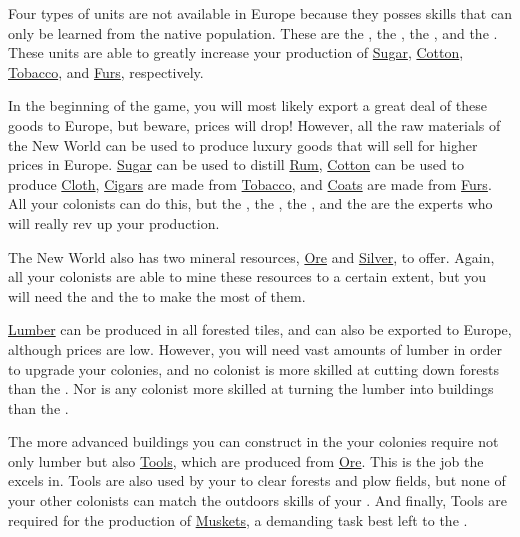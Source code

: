 \documentclass[12pt]{article}
\begin{document}
Four types of units are not available in Europe because they posses
skills that can only be learned from the native population. These are
the , the , the
, and the . These units are able to greatly increase your production of
\hyperlink{Sugar}{Sugar}, \hyperlink{Cotton}{Cotton},
\hyperlink{Tobacco}{Tobacco}, and \hyperlink{Furs}{Furs},
respectively.

In the beginning of the game, you will most likely export a great deal
of these goods to Europe, but beware, prices will drop! However, all
the raw materials of the New World can be used to produce luxury goods
that will sell for higher prices in Europe. \hyperlink{Sugar}{Sugar}
can be used to distill \hyperlink{Rum}{Rum},
\hyperlink{Cotton}{Cotton} can be used to produce
\hyperlink{Cloth}{Cloth}, \hyperlink{Cigars}{Cigars} are made from
\hyperlink{Tobacco}{Tobacco}, and \hyperlink{Coats}{Coats} are made
from \hyperlink{Furs}{Furs}. All your colonists can do this, but the
, the , the , and the  are the experts who
will really rev up your production.

The New World also has two mineral resources, \hyperlink{Ore}{Ore} and
\hyperlink{Silver}{Silver}, to offer. Again, all your colonists are
able to mine these resources to a certain extent, but you will need
the  and the  to make
the most of them.

\hyperlink{Lumber}{Lumber} can be produced in all forested tiles, and
can also be exported to Europe, although prices are low. However, you
will need vast amounts of lumber in order to upgrade your colonies,
and no colonist is more skilled at cutting down forests than the
. Nor is any colonist more skilled at turning
the lumber into buildings than the .

The more advanced buildings you can construct in the your colonies
require not only lumber but also \hyperlink{Tools}{Tools}, which are
produced from \hyperlink{Ore}{Ore}. This is the job the  excels in.  Tools are also used by your  to
clear forests and plow fields, but none of your other colonists can
match the outdoors skills of your . And finally,
Tools are required for the production of \hyperlink{Muskets}{Muskets},
a demanding task best left to the .
\end{document}
